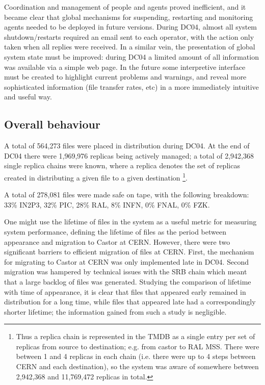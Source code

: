 \documentclass{cmspaper}
\begin{document}
Coordination and management of people and agents proved inefficient,
and it became clear that global mechanisms for suspending, restarting
and monitoring agents needed to be deployed in future versions. During
DC04, almost all system shutdown/restarts required an email sent to
each operator, with the action only taken when all replies were
received. In a similar vein, the presentation of global system state
must be improved: during DC04 a limited amount of all information was
available via a simple web page. In the future some interpretive
interface must be created to highlight current problems and warnings,
and reveal more sophisticated information (file transfer rates, etc)
in a more immediately intuitive and useful way.

\subsection{Overall behaviour}
A total of 564,273 files were placed in distribution during DC04. At
the end of DC04 there were 1,969,976 replicas being actively managed;
a total of 2,942,368 single replica chains were known, where a replica
denotes the set of replicas created in distributing a given file to
a given destination \footnote{Thus a replica chain is represented in 
the TMDB as a single entry per set of replicas from source
to destination; e.g. from castor to RAL MSS. There were between 1 and
4 replicas in each chain (i.e. there were up to 4 steps between CERN
and each destination), so
the system was aware of somewhere between 2,942,368 and 11,769,472
replicas in total.}.

A total of 278,081 files were made safe on tape, with the following
breakdown: 33\% IN2P3, 32\% PIC, 28\% RAL, 8\% INFN, 0\% FNAL, 0\%
FZK.

One might use the lifetime of files in the system as a useful metric
for measuring system performance, defining the lifetime of files as
the period between appearance and migration to Castor at
CERN. However, there were two significant barriers to efficient
migration of files at CERN. First, the mechanism for migrating to
Castor at CERN was only implemented late in DC04. Second migration was
hampered by technical issues with the SRB chain which meant that a
large backlog of files was generated. Studying the comparison of
lifetime with time of appearance, it is clear that files that appeared
early remained in distribution for a long time, while files that
appeared late had a correspondingly shorter lifetime; the information
gained from such a study is negligible.
\end{document}
